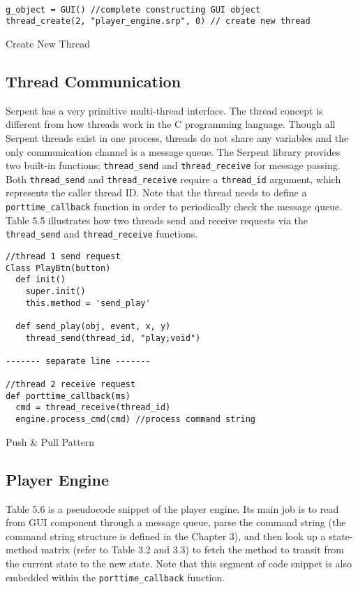 \begin{table}[htdp]
\centering

\begin{lstlisting}

g_object = GUI() //complete constructing GUI object
thread_create(2, "player_engine.srp", 0) // create new thread

\end{lstlisting}

\caption[Create New Thread]{Create New Thread}
\end{table}

\subsection{Thread Communication}

Serpent has a very primitive multi-thread interface. The thread concept is 
different from how threads work in the C programming language. Though all Serpent 
threads exist in one process, threads do not share any variables and the only 
communication channel is a message queue. The Serpent library provides two
built-in functions: \texttt{thread\_send} and \texttt{thread\_receive} 
for message passing. Both \texttt{thread\_send} and \texttt{thread\_receive}
require a \texttt{thread\_id} argument, which represents the caller thread ID. 
Note that the thread needs to define a \texttt{porttime\_callback} function
in order to periodically check the message queue. Table 5.5 illustrates how 
two threads send and receive requests via the \texttt{thread\_send} and 
\texttt{thread\_receive} functions.
\begin{table}[htdp]
\centering
\begin{lstlisting}
//thread 1 send request 
Class PlayBtn(button)
  def init()
    super.init()
    this.method = 'send_play'

  def send_play(obj, event, x, y)
    thread_send(thread_id, "play;void")

------- separate line -------

//thread 2 receive request 
def porttime_callback(ms)
  cmd = thread_receive(thread_id)
  engine.process_cmd(cmd) //process command string
\end{lstlisting}
\caption[Push \& Pull Pattern]{Push \& Pull Pattern}
\end{table}

\subsection{Player Engine}
Table 5.6 is a pseudocode snippet of the player engine. Its main job is to read 
from GUI component through a message queue, parse the command string (the  
command string structure is defined in the Chapter 3), and then look up a state-method 
matrix (refer to Table 3.2 and 3.3) to fetch the method to transit from the 
current state to the new state. Note that this segment of code snippet is also 
embedded within the \texttt{porttime\_callback} function.


